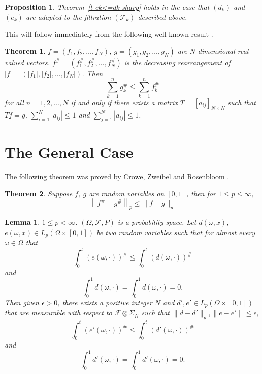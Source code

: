 \documentclass[12pt]{amsart}
\newtheorem{lem}[thm]{Lemma}
\newtheorem{pro}[thm]{Proposition}
\newtheorem{thmofothers}{Theorem}
\begin{document}
\begin{pro}
\label{t ek<=dk sharp disc}
Theorem~\ref{t ek<=dk sharp} holds in the case that
$(d_k)$ and $(e_k)$ are
adapted to the filtration $(\mathcal F_k)$ described above.
\end{pro}

This will follow immediately from the following well-known result
\cite{LT}.
\begin{thmofothers}
\label{t fsharp<=gsharp} $f=(f_1,f_2,\dots,f_N)$,
$g=(g_1,g_2,\dots,g_N)$ are $N$-dimensional real-valued vectors.
$f^\#=(f_1^\#,f_2^\#,\dots,f_N^\#)$ is the decreasing
rearrangement of $|f|=(|f_1|,|f_2|,\dots,|f_N|)$. Then
\[ \sum_{k=1}^n g_k^\#\leq \sum_{k=1}^n f_k^\# \]
for all $n=1,2,\dots,N$ if and only if there exists a matrix
$T=[a_{ij}]_{N \times N}$ such that $Tf=g$, $\sum_{i=1}^N
|a_{ij}|\leq 1$ and $\sum_{j=1}^N |a_{ij}|\leq 1$.
\end{thmofothers}









\section{The General Case}
The following theorem was proved by Crowe, Zweibel and Rosenbloom
\cite{CZR}.
\begin{thmofothers}
\label{t CZR}
Suppose $f$, $g$ are random variables on $[0,1]$, then for $1\leq
p\leq \infty $,
\[\left\|f^\# -g^\# \right\|_p\leq \|f -g\|_p\]
\end{thmofothers}


\begin{lem}\label{app} $1 \le p < \infty$. $(\Omega,\mathcal{F},P)$
is a probability space. Let $d(\omega,x)$,$e(\omega,x) \in
L_p(\Omega\times[0,1])$ be two random variables such that for
almost every $\omega \in \Omega$ that
$$
   \int_0^t (e(\omega,\cdot))^\#
   \le
   \int_0^t (d(\omega,\cdot))^\#
$$
and
$$ \int_0^1 d(\omega,\cdot) = \int_0^1 d(\omega,\cdot) = 0.
$$
Then given $\epsilon>0$, there exists a positive integer $N$ and
$d',e' \in L_p(\Omega\times[0,1])$ that are measurable with
respect to $\mathcal{F}\otimes\Sigma_N$ such that $\|d-d'\|_p,
\|e-e'\| \le \epsilon$,
$$
   \int_0^t (e'(\omega,\cdot))^\#
   \le
   \int_0^t (d'(\omega,\cdot))^\#
$$
and
$$ \int_0^1 d'(\omega,\cdot) = \int_0^1 d'(\omega,\cdot) = 0.
$$
\end{lem}
\end{document}
